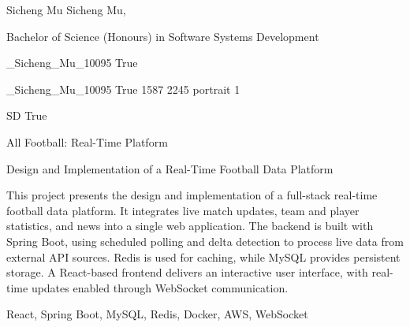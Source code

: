 
\begingroup{}\relax



\def\Key{_Sicheng_Mu_10095}

{Sicheng Mu}
{Sicheng Mu, }

{Bachelor of Science (Honours) in Software Systems Development}

{_Sicheng_Mu_10095}
{True}

{_Sicheng_Mu_10095}
{True}
{1587}
{2245}
{portrait}
{1}

{SD}
{True}

{All Football: Real-Time Platform}

{Design and Implementation of a Real-Time Football Data Platform}

{This project presents the design and implementation of a full-stack real-time football data platform. It integrates live match updates, team and player statistics, and news into a single web application. The backend is built with Spring Boot, using scheduled polling and delta detection to process live data from external {API} sources. Redis is used for caching, while MySQL provides persistent storage. A React-based frontend delivers an interactive user interface, with real-time updates enabled through WebSocket communication.}

{React, Spring Boot, MySQL, Redis, Docker, AWS, WebSocket}

